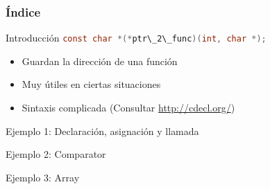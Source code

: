 \documentclass{mybeamer}
\institute{
	{\textsl{\large Tema 11}}
	\\[1em]
	\textbf{\Large Punteros a funciones}
}
\begin{document}
\begin{frame}
\titlepage
\end{frame}

\begin{frame}
\frametitle{Índice}
	\tableofcontents
\end{frame}

\begin{framesec}{Introducción}
	\centering
	\lstinline[language=C]|const char *(*ptr\_2\_func)(int, char *);|
	\vspace{2em}

	\begin{itemize}
		\item Guardan la dirección de una función
		\item Muy útiles en ciertas situaciones
		\item Sintaxis complicada (Consultar \url{http://cdecl.org/})
	\end{itemize}
\end{framesec}

\begin{framesec}[Ejemplo 1]{Ejemplo 1: Declaración, asignación y llamada}
	
\end{framesec}

\def\cmplst[#1]{
	
}
\begin{framesec}[Ejemplo 2]{Ejemplo 2: Comparator}
	\only<1| handout:1>{                       %
		\cmplst[3-6]
		\cmplst[44-53]
	}
	\only<2| handout:2>{\cmplst[8-26]}         %
	\only<3| handout:3>{\cmplst[33-34, 35-42]} %
	\only<4| handout:4>{                       %
		\cmplst[44-53]
		
	}
\end{framesec}

\def\arrylst[#1]{
	
}
\begin{framesec}[Ejemplo 3]{Ejemplo 3: Array}
	\only<1| handout:1>{\arrylst[1-8, 11-16, 18-27]}   %
	\only<2| handout:2>{\arrylst[1-17, 25-27]}         %
\end{framesec}
\end{document}
